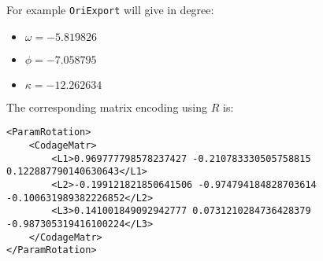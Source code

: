 For example {\tt OriExport} will give in degree:
\newline


\begin{itemize}
\item $\omega=-5.819826$  
\item $\phi=-7.058795$  
\item $\kappa=-12.262634$\newline
\end{itemize}



The corresponding matrix encoding using $R$ is:


\begin{verbatim}
<ParamRotation>
    <CodageMatr>
        <L1>0.969777798578237427 -0.210783330505758815 0.122887790140630643</L1>
        <L2>-0.199121821850641506 -0.974794184828703614 -0.100631989382226852</L2>
        <L3>0.141001849092942777 0.0731210284736428379 -0.987305319416100224</L3>
	</CodageMatr>
</ParamRotation>
\end{verbatim}




